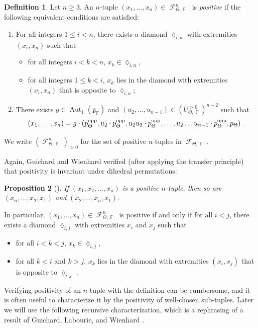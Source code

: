 \documentclass{amsart}
\theoremstyle{plain}
\newtheorem{proposition}{Proposition}[section]
\theoremstyle{definition}
\newtheorem{definition}[proposition]{Definition}
\DeclareMathOperator{\Aut}{Aut}
\DeclareMathOperator{\Diam}{\lozenge}
\DeclareMathOperator{\Fc}{\mathcal{F}}
\DeclareMathOperator{\Fb}{{\mathbb{F}}}
\newcommand{\opp}{\textnormal{opp}}
\newcommand{\1}{\mathbf{1}}
\begin{document}
\begin{definition}
\label{def:PositiveTuples}
    Let $n\ge 3$. An $n$-tuple $(x_1,\ldots, x_n)\in \Fc_{\Theta,\Fb}^n$ is \emph{positive} if the following equivalent conditions are satisfied:
    \begin{enumerate}
        \item For all integers $1\le i<n$, there exists a diamond $\Diam_{i,n}$ with extremities $(x_i,x_n)$ such that 
        \begin{itemize}
            \item for all integers $i<k<n$, $x_k \in \Diam_{i,n}$,
            \item for all integers $1\le k<i$, $x_k$ lies in the diamond with extremities $(x_i,x_n)$ that is opposite to $\Diam_{i,n}$;
        \end{itemize} 
        \item There exists $g\in \Aut_1(\mathfrak g_{\Fb})$ and $(u_2,\ldots ,u_{n-1})\in (U_{\Theta,\Fb}^{>0})^{n-2}$ such that
        \[(x_1,\ldots, x_n) = g\cdot (p_\Theta^\opp, u_2\cdot p_\Theta^\opp, u_2u_3\cdot p_\Theta^\opp, \ldots, u_2\ldots u_{n-1}\cdot p_\Theta^\opp, p_\Theta)~.\]
    \end{enumerate}
     We write $(\Fc_{\Theta,\Fb}^n)_{>0}$ for the set of positive $n$-tuples in $\Fc_{\Theta,\Fb}$. 
\end{definition}


Again, Guichard and Wienhard \cite{guichard2025generalizing} verified (after applying the transfer principle) that positivity is invariant under dihedral permutations:

\begin{proposition}[{\cite[Lemma 13.24]{guichard2025generalizing}}]
    If $(x_1,x_2, \ldots, x_n)$ is a positive $n$-tuple, then so are $(x_n,\ldots, x_2, x_1)$ and $(x_2,\ldots, x_n, x_1)$.
\end{proposition}

In particular, $(x_1,\dots,x_n)\in\Fc_{\Theta,\Fb}^n$ is positive if and only if for all $i<j$, there exists a diamond $\Diam_{i,j}$ with extremities $x_i$ and $x_j$ such that 
\begin{itemize}
    \item for all $i<k<j$, $x_k \in \Diam_{i,j}$,
    \item for all $k<i$ and $k>j$, $x_k$ lies in the diamond with extremities $(x_i,x_j)$ that is opposite to $\Diam_{i,j}$ .
\end{itemize}  

Verifying positivity of an $n$-tuple with the definition can be cumbersome, and it is often useful to characterize it by the positivity of well-chosen sub-tuples. Later we will use the following recursive characterization, which is a rephrasing of a result of Guichard, Labourie, and Wienhard \cite{GLW}.
\end{document}

